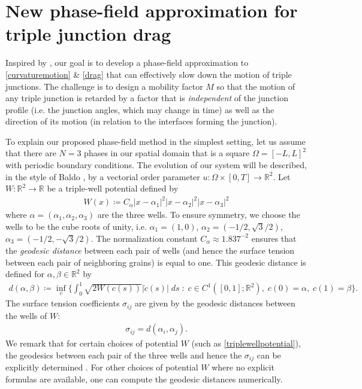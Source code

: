 \documentclass{article}
\theoremstyle{plain}
\theoremstyle{definition}
\theoremstyle{remark}
\newcommand{\R}{\mathbb{R}}
\begin{document}
\section{New phase-field approximation for triple junction drag}
\label{sec:ourmodel}
Inspired by \cite{johnsonvoorhees}, our goal is to develop a phase-field approximation to \eqref{curvaturemotion} \& \eqref{drag} that can effectively slow down the motion of triple junctions. The challenge is to design a mobility factor $M$ so that the motion of any triple junction is retarded by a factor that is {\em independent} of the junction profile (i.e. the junction angles, which may change in time) as well as the direction of its motion (in relation to the interfaces forming the junction). 

To explain our proposed phase-field method in the simplest setting, let us assume that there are $N=3$ phases in our spatial domain that is a square $\Omega = [-L,L]^2$ with periodic boundary conditions. The evolution of our system will be described, in the style of Baldo \cite{BALDO199067}, by a vectorial order parameter $u : \Omega \times [0,T] \to \R^2$. Let $W:\R^2 \to \R$ be a triple-well potential defined by
\begin{align}\label{triplewellpotential}
    W(x) \coloneqq C_\alpha |x - \alpha_1|^2 |x - \alpha_2|^2 |x - \alpha_3|^2
\end{align}
where $\alpha = (\alpha_1,\alpha_2,\alpha_3)$ are the three wells. To ensure symmetry, we choose the wells to be the cube roots of unity, i.e. $\alpha_1 = (1,0)$, $\alpha_2 = (-1/2 , \sqrt{3}/2)$, $\alpha_3 = (-1/2 , -\sqrt{3}/2)$. The normalization constant $C_\alpha \approx 1.837^{-2}$ ensures that the \emph{geodesic distance} \cite{BALDO199067} between each pair of wells (and hence the surface tension between each pair of neighboring grains) is equal to one.
This geodesic distance is defined for $\alpha,\beta\in\R^2$ by
\begin{align}
\label{eq:distance}
    d(\alpha,\beta)\coloneqq \inf_{c}\bigg\{ \int_0^1 \sqrt{2W(c(s))}|\dot{c}(s)|\;ds \;:\; c\in C^1([0,1];\R^2),\;c(0)=\alpha,\;c(1) = \beta \bigg\}.
\end{align}
The surface tension coefficients $\sigma_{ij}$ are given by the geodesic distances between the wells of $W$:
\begin{align}
    \sigma_{ij} = d(\alpha_i,\alpha_j).
\end{align}
We remark that for certain choices of potential $W$ (such as \eqref{triplewellpotential}), the geodesics between each pair of the three wells and hence the $\sigma_{ij}$ can be explicitly determined \cite{ALIKAKOS_BETELU_CHEN_2006}.
For other choices of potential $W$ where no explicit formulas are available, one can compute the geodesic distances numerically.
\end{document}
